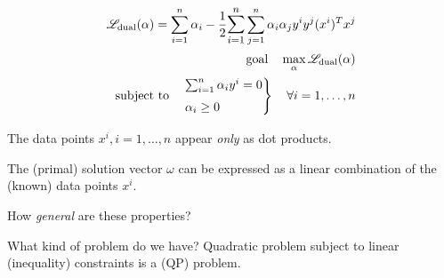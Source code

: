 
\begin{align*}
  \mathscr{L}_\text{dual}(\alpha) = \sum_{i=1}^n \alpha_i - \frac{1}{2} \mathlarger{\sum_{i=1}^n} \sum_{j=1}^n \alpha_i \alpha_j y^i y^j (x^i)^T x^j \\
	\text{goal} \quad \max_{\alpha} \mathscr{L}_\text{dual}(\alpha)                                                                       \\
	\text{subject to} \quad
	\begin{rcases*}
		\sum_{i=1}^n \alpha_i y^i = 0 \\
		\alpha_i \geq 0
	\end{rcases*} \quad \forall i=1,\dots,n
\end{align*}

\begin{note}{}{}
	The data points $x^i, i=1,\dots,n$  appear \emph{only} as
	dot products.
\end{note}

\begin{note}{}{}
	The (primal) solution vector $\omega$
	can be expressed as a linear combination of the (known) data points $x^i$.
\end{note}


\begin{question}{How \emph{general} are these properties?}{}
\end{question}

\begin{question}{What kind of problem do we have?}{}
	Quadratic problem subject to linear (inequality) constraints is
	a  (QP) problem.
\end{question}

